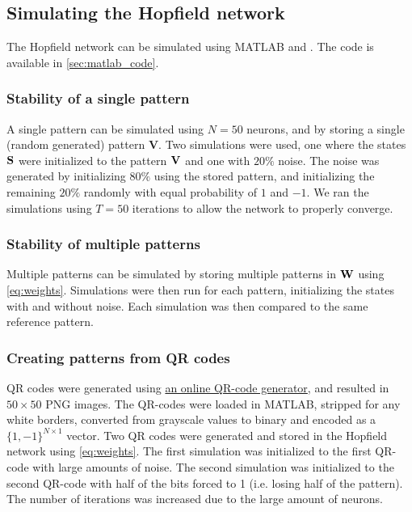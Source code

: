\subsection{Simulating the Hopfield network}
The Hopfield network can be simulated using MATLAB and . The code is available in \cref{sec:matlab_code}.
\subsubsection*{Stability of a single pattern}
A single pattern can be simulated using $N=50$ neurons, and by storing a single (random generated) pattern $\mathbf{V}$. Two simulations were used, one where the states $\bf S$ were initialized to the pattern $\bf V$ and one with $20\%$ noise. The noise was generated by initializing $80\%$ using the stored pattern, and initializing the remaining $20\%$ randomly with equal probability of $1$ and $-1$. We ran the simulations using $T=50$ iterations to allow the network to properly converge.
\subsubsection*{Stability of multiple patterns}
Multiple patterns can be simulated by storing multiple patterns in $\bf W$ using \cref{eq:weights}. Simulations were then run for each pattern, initializing the states with and without noise. Each simulation was then compared to the same reference pattern.

\subsubsection*{Creating patterns from QR codes}
QR codes were generated using \href{https://miniwebtool.com/qr-code-generator/}{an online QR-code generator}, and resulted in $50 \times 50$ PNG images. The QR-codes were loaded in MATLAB, stripped for any white borders, converted from grayscale values to binary and encoded as a $\{1, -1\}^{N \times 1}$ vector. Two QR codes were generated and stored in the Hopfield network using \cref{eq:weights}. The first simulation was initialized to the first QR-code with large amounts of noise. The second simulation was initialized to the second QR-code with half of the bits forced to 1 (i.e. losing half of the pattern). The number of iterations was increased due to the large amount of neurons.



